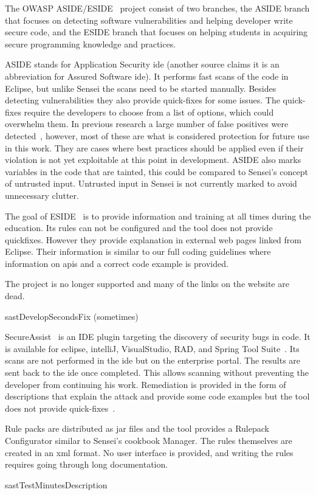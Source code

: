 {
\label{bc:ASIDE}
The OWASP ASIDE/ESIDE~\cite{aside} project consist of two branches, the ASIDE branch that focuses on detecting software vulnerabilities and helping developer write secure code, and the ESIDE branch that focuses on helping students in acquiring secure programming knowledge and practices.

ASIDE stands for Application Security \gls{ide} (another source claims it is an abbreviation for Assured Software \gls{ide}). It performs fast scans of the code in Eclipse, but unlike Sensei the scans need to be started manually.
Besides detecting vulnerabilities they also provide quick-fixes for some issues. 
The quick-fixes require the developers to choose from a list of options, which could overwhelm them.
In previous research a large number of false positives were detected~\cite{xie2011aside}, however, most of these are what is considered protection for future use in this work.
They are cases where best practices should be applied even if their violation is not yet exploitable at this point in development.
ASIDE also marks variables in the code that are tainted, this could be compared to Sensei's concept of untrusted input.
Untrusted input in Sensei is not currently marked to avoid unnecessary clutter. 

The goal of ESIDE~\cite{eside,whitney2018embedding} is to provide information and training at all times during the education. Its rules can not be configured and the tool does not provide quickfixes. However they provide explanation in external web pages linked from Eclipse. Their information is similar to our full coding guidelines where information on \glspl{api} and a correct code example is provided.

The project is no longer supported and many of the links on the website are dead.
}{\gls{sast}}{Develop}{Seconds}{Fix (sometimes)}

{
\label{bc:SecureAssist}
SecureAssist~\cite{secureassist} is an IDE plugin targeting the discovery of security bugs in code.
It is available for eclipse, intelliJ, VisualStudio, RAD, and Spring Tool Suite~\cite{sastinide}.
Its scans are not performed in the \gls{ide} but on the enterprise portal.
The results are sent back to the \gls{ide} once completed.
This allows scanning without preventing the developer from continuing his work. Remediation is provided in the form of descriptions that explain the attack and provide some code examples but the tool does not provide quick-fixes~\cite{secureassistide}. 

Rule packs are distributed as \gls{jar} files and the tool provides a Rulepack Configurator similar to Sensei's cookbook Manager.
The rules themselves are created in an \gls{xml} format.
No user interface is provided, and writing the rules requires going through long documentation.
}{\gls{sast}}{Test}{Minutes}{Description}

